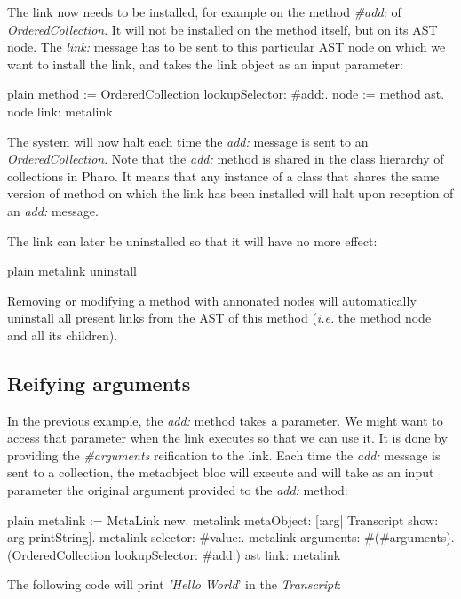 \documentclass[10pt,twoside,english]{_support/latex/sbabook/sbabook}
\begin{document}
The link now needs to be installed, for example on the method \textit{\#add:} of \textit{OrderedCollection}. It will not be installed on the method itself, but on its AST node. The \textit{link:} message has to be sent to this particular AST node on which we want to install the link, and takes the link object as an input parameter:

\begin{displaycode}{plain}
method := OrderedCollection lookupSelector: #add:.
node := method ast.
node link: metalink
\end{displaycode}

The system will now halt each time the \textit{add:} message is sent to an \textit{OrderedCollection}. Note that the \textit{add:} method is shared in the class hierarchy of collections in Pharo. It means that any instance of a class that shares the same version of method on which the link has been installed will halt upon reception of an \textit{add:} message.

The link can later be uninstalled so that it will have no more effect:

\begin{displaycode}{plain}
metalink uninstall
\end{displaycode}

Removing or modifying a method with annonated nodes will automatically uninstall all present links from the AST of this method
(\textit{i.e.} the method node and all its children).
\subsection{Reifying arguments}
In the previous example, the \textit{add:} method takes a parameter. We might want to access that parameter when the link executes so that we can use it. It is done by providing the \textit{\#arguments} reification to the link. Each time the \textit{add:} message is sent to a collection, the metaobject bloc will execute and will take as an input parameter the original argument provided to the \textit{add:} method:

\begin{displaycode}{plain}
metalink := MetaLink new.
metalink metaObject: [:arg| Transcript show: arg printString].
metalink selector: #value:.
metalink arguments: #(#arguments).
(OrderedCollection lookupSelector: #add:) ast link: metalink
\end{displaycode}

The following code will print \textit{'Hello World}' in the \textit{Transcript}:
\end{document}

